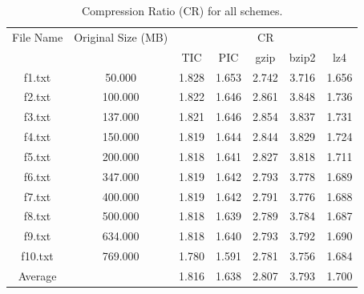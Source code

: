 \begin{table}[ht]
\centering
\begin{tabular}{ccccccc}
\hline
File Name & Original Size (MB) & \multicolumn{5}{c}{CR} \\
 &  & TIC & PIC & gzip & bzip2 & lz4 \\
\hline
f1.txt & 50.000 & 1.828 & 1.653 & 2.742 & 3.716 & 1.656 \\
f2.txt & 100.000 & 1.822 & 1.646 & 2.861 & 3.848 & 1.736 \\
f3.txt & 137.000 & 1.821 & 1.646 & 2.854 & 3.837 & 1.731 \\
f4.txt & 150.000 & 1.819 & 1.644 & 2.844 & 3.829 & 1.724 \\
f5.txt & 200.000 & 1.818 & 1.641 & 2.827 & 3.818 & 1.711 \\
f6.txt & 347.000 & 1.819 & 1.642 & 2.793 & 3.778 & 1.689 \\
f7.txt & 400.000 & 1.819 & 1.642 & 2.791 & 3.776 & 1.688 \\
f8.txt & 500.000 & 1.818 & 1.639 & 2.789 & 3.784 & 1.687 \\
f9.txt & 634.000 & 1.818 & 1.640 & 2.793 & 3.792 & 1.690 \\
f10.txt & 769.000 & 1.780 & 1.591 & 2.781 & 3.756 & 1.684 \\
Average &  & 1.816 & 1.638 & 2.807 & 3.793 & 1.700 \\
\hline
\end{tabular}
\caption{Compression Ratio (CR) for all schemes.}
\label{tab:cr}
\end{table}
